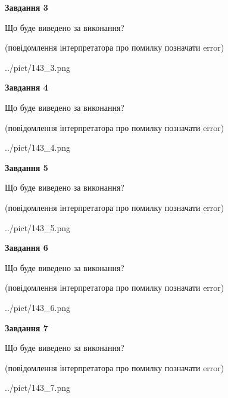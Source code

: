 \documentclass[12pt, ukrainian]{article}
\begin{document}
{\begin {large}
{\begin {center}\textbf{Завдання 3}\end {center}}\par
Що буде виведено за виконання?\par
 (повідомлення інтерпретатора про помилку позначати error)\par
\begin{center}
	{../pict/143_3.png}
\end{center}
\newpage

{\begin {center}\textbf{Завдання 4}\end {center}}\par
Що буде виведено за виконання?\par
 (повідомлення інтерпретатора про помилку позначати error)\par
\begin{center}
	{../pict/143_4.png}
\end{center}
\newpage

{\begin {center}\textbf{Завдання 5}\end {center}}\par
Що буде виведено за виконання?\par
 (повідомлення інтерпретатора про помилку позначати error)\par
\begin{center}
	{../pict/143_5.png}
\end{center}
\newpage

{\begin {center}\textbf{Завдання 6}\end {center}}\par
Що буде виведено за виконання?\par
 (повідомлення інтерпретатора про помилку позначати error)\par
\begin{center}
	{../pict/143_6.png}
\end{center}
\newpage

{\begin {center}\textbf{Завдання 7}\end {center}}\par
Що буде виведено за виконання?\par
 (повідомлення інтерпретатора про помилку позначати error)\par
\begin{center}
	{../pict/143_7.png}
\end{center}
\newpage


\end{large}}
\end{document}
